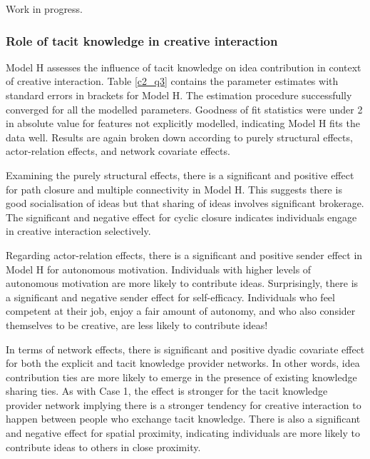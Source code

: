 Work in progress.

\subsubsection{Role of tacit knowledge in creative interaction}

Model H assesses the influence of tacit knowledge on idea contribution in context of creative interaction. Table \ref{c2_q3} contains the parameter estimates with standard errors in brackets for Model H. The estimation procedure successfully converged for all the modelled parameters. Goodness of fit statistics were under 2 in absolute value for features not explicitly modelled, indicating Model H fits the data well. Results are again broken down according to purely structural effects, actor-relation effects, and network covariate effects.\medskip 

Examining the purely structural effects, there is a significant and positive effect for path closure and multiple connectivity in Model H. This suggests there is good socialisation of ideas but that sharing of ideas involves significant brokerage. The significant and negative effect for cyclic closure indicates individuals engage in creative interaction selectively.\medskip

Regarding actor-relation effects, there is a significant and positive sender effect in Model H for autonomous motivation. Individuals with higher levels of autonomous motivation are more likely to contribute ideas. Surprisingly, there is a significant and negative sender effect for self-efficacy. Individuals who feel competent at their job, enjoy a fair amount of autonomy, and who also consider themselves to be creative, are less likely to contribute ideas!\medskip

In terms of network effects, there is significant and positive dyadic covariate effect for both the explicit and tacit knowledge provider networks. In other words, idea contribution ties are more likely to emerge in the presence of existing knowledge sharing ties. As with Case 1, the effect is stronger for the tacit knowledge provider network implying there is a stronger tendency for creative interaction to happen between people who exchange tacit knowledge. There is also a significant and negative effect for spatial proximity, indicating individuals are more likely to contribute ideas to others in close proximity. \medskip  

